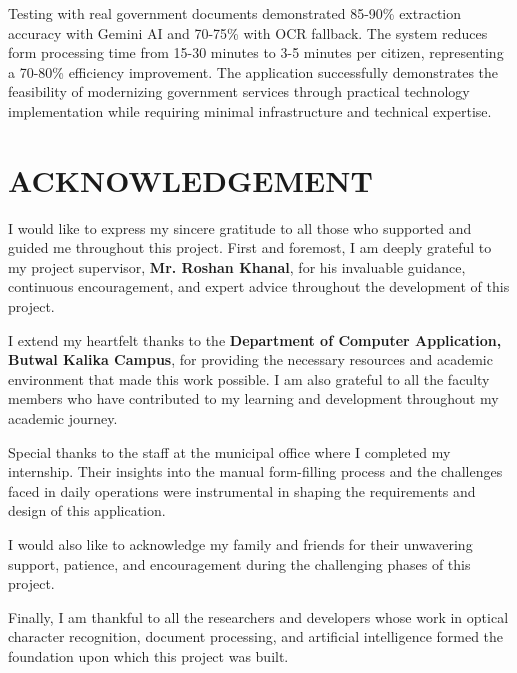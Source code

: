 \documentclass[12pt]{report}
\begin{document}
Testing with real government documents demonstrated 85-90\% extraction accuracy with Gemini AI and 70-75\% with OCR fallback. The system reduces form processing time from 15-30 minutes to 3-5 minutes per citizen, representing a 70-80\% efficiency improvement. The application successfully demonstrates the feasibility of modernizing government services through practical technology implementation while requiring minimal infrastructure and technical expertise.

\newpage
\chapter*{ACKNOWLEDGEMENT}

I would like to express my sincere gratitude to all those who supported and guided me throughout this project. First and foremost, I am deeply grateful to my project supervisor, \textbf{Mr. Roshan Khanal}, for his invaluable guidance, continuous encouragement, and expert advice throughout the development of this project.

I extend my heartfelt thanks to the \textbf{Department of Computer Application, Butwal Kalika Campus}, for providing the necessary resources and academic environment that made this work possible. I am also grateful to all the faculty members who have contributed to my learning and development throughout my academic journey.

Special thanks to the staff at the municipal office where I completed my internship. Their insights into the manual form-filling process and the challenges faced in daily operations were instrumental in shaping the requirements and design of this application.

I would also like to acknowledge my family and friends for their unwavering support, patience, and encouragement during the challenging phases of this project.

Finally, I am thankful to all the researchers and developers whose work in optical character recognition, document processing, and artificial intelligence formed the foundation upon which this project was built.


\newpage
{}
\tableofcontents

\newpage
\vspace*{-1.5cm} %
\listoffigures
\end{document}
